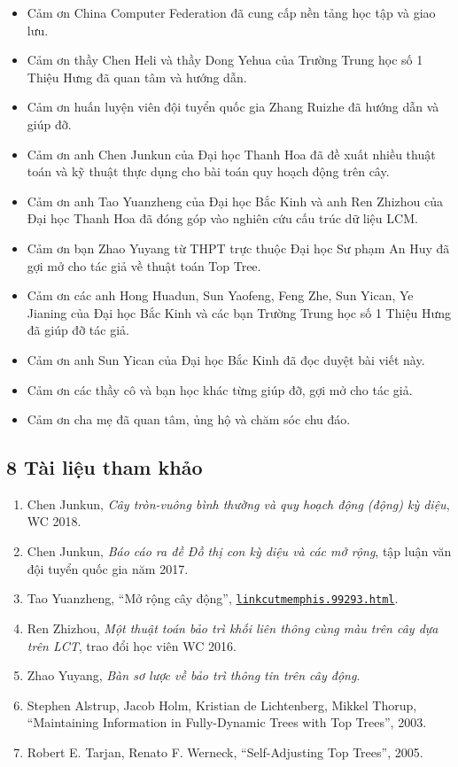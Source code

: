 \documentclass[11pt]{article}
\begin{document}
\begin{itemize}
  \item Cảm ơn China Computer Federation đã cung cấp nền tảng học tập và giao
  lưu.
  \item Cảm ơn thầy Chen Heli và thầy Dong Yehua của Trường Trung học số 1 Thiệu
  Hưng đã quan tâm và hướng dẫn.
  \item Cảm ơn huấn luyện viên đội tuyển quốc gia Zhang Ruizhe đã hướng dẫn và
  giúp đỡ.
  \item Cảm ơn anh Chen Junkun của Đại học Thanh Hoa đã đề xuất nhiều thuật toán
  và kỹ thuật thực dụng cho bài toán quy hoạch động trên cây.
  \item Cảm ơn anh Tao Yuanzheng của Đại học Bắc Kinh và anh Ren Zhizhou của Đại
  học Thanh Hoa đã đóng góp vào nghiên cứu cấu trúc dữ liệu LCM.
  \item Cảm ơn bạn Zhao Yuyang từ THPT trực thuộc Đại học Sư phạm An Huy đã gợi
  mở cho tác giả về thuật toán Top Tree.
  \item Cảm ơn các anh Hong Huadun, Sun Yaofeng, Feng Zhe, Sun Yican, Ye Jianing
  của Đại học Bắc Kinh và các bạn Trường Trung học số 1 Thiệu Hưng đã giúp đỡ
  tác giả.
  \item Cảm ơn anh Sun Yican của Đại học Bắc Kinh đã đọc duyệt bài viết này.
  \item Cảm ơn các thầy cô và bạn học khác từng giúp đỡ, gợi mở cho tác giả.
  \item Cảm ơn cha mẹ đã quan tâm, ủng hộ và chăm sóc chu đáo.
\end{itemize}

\subsection*{8 Tài liệu tham khảo}

\begin{enumerate}
  \item Chen Junkun, \emph{Cây tròn-vuông bình thường và quy hoạch động (động)
  kỳ diệu}, WC 2018.
  \item Chen Junkun, \emph{Báo cáo ra đề \emph{Đồ thị con kỳ diệu} và các mở
  rộng}, tập luận văn đội tuyển quốc gia năm 2017.
  \item Tao Yuanzheng, ``Mở rộng cây động'',
  \href{http://memphis.is-programmer.com/2015/8/7/linkcutmemphis.99293.html}{\texttt{linkcutmemphis.99293.html}}.
  \item Ren Zhizhou, \emph{Một thuật toán bảo trì khối liên thông cùng màu trên
  cây dựa trên LCT}, trao đổi học viên WC 2016.
  \item Zhao Yuyang, \emph{Bàn sơ lược về bảo trì thông tin trên cây động}.
  \item Stephen Alstrup, Jacob Holm, Kristian de Lichtenberg, Mikkel Thorup,
  ``Maintaining Information in Fully-Dynamic Trees with Top Trees'', 2003.
  \item Robert E. Tarjan, Renato F. Werneck, ``Self-Adjusting Top Trees'', 2005.
\end{enumerate}
\end{document}

